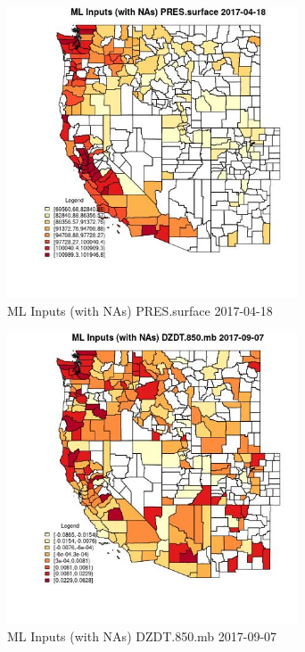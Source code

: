 \begin{figure} 
\centering  
\includegraphics[width=0.77\textwidth]{Code_Outputs/Report_ML_input_PM25_Step4_part_e_de_duplicated_aves_compiled_2019-05-20wNAs_CountyPRESsurfaceMean2017-04-18.jpg} 
\caption{\label{fig:Report_ML_input_PM25_Step4_part_e_de_duplicated_aves_compiled_2019-05-20wNAsCountyPRESsurfaceMean2017-04-18}ML Inputs (with NAs) PRES.surface 2017-04-18} 
\end{figure} 
 

\begin{figure} 
\centering  
\includegraphics[width=0.77\textwidth]{Code_Outputs/Report_ML_input_PM25_Step4_part_e_de_duplicated_aves_compiled_2019-05-20wNAs_CountyDZDT850mbMean2017-09-07.jpg} 
\caption{\label{fig:Report_ML_input_PM25_Step4_part_e_de_duplicated_aves_compiled_2019-05-20wNAsCountyDZDT850mbMean2017-09-07}ML Inputs (with NAs) DZDT.850.mb 2017-09-07} 
\end{figure} 
 

